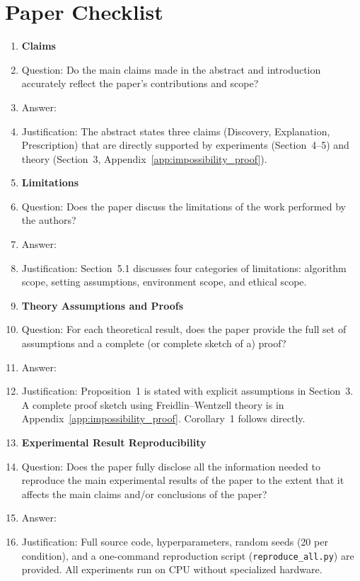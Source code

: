 
\section*{Paper Checklist}

\begin{enumerate}

\item {\bf Claims}
    \item[] Question: Do the main claims made in the abstract and introduction accurately reflect the paper's contributions and scope?
    \item[] Answer: \answerYes{}
    \item[] Justification: The abstract states three claims (Discovery, Explanation, Prescription) that are directly supported by experiments (Section~4--5) and theory (Section~3, Appendix~\ref{app:impossibility_proof}).

\item {\bf Limitations}
    \item[] Question: Does the paper discuss the limitations of the work performed by the authors?
    \item[] Answer: \answerYes{}
    \item[] Justification: Section~5.1 discusses four categories of limitations: algorithm scope, setting assumptions, environment scope, and ethical scope.

\item {\bf Theory Assumptions and Proofs}
    \item[] Question: For each theoretical result, does the paper provide the full set of assumptions and a complete (or complete sketch of a) proof?
    \item[] Answer: \answerYes{}
    \item[] Justification: Proposition~1 is stated with explicit assumptions in Section~3. A complete proof sketch using Freidlin--Wentzell theory is in Appendix~\ref{app:impossibility_proof}. Corollary~1 follows directly.

\item {\bf Experimental Result Reproducibility}
    \item[] Question: Does the paper fully disclose all the information needed to reproduce the main experimental results of the paper to the extent that it affects the main claims and/or conclusions of the paper?
    \item[] Answer: \answerYes{}
    \item[] Justification: Full source code, hyperparameters, random seeds (20 per condition), and a one-command reproduction script (\texttt{reproduce\_all.py}) are provided. All experiments run on CPU without specialized hardware.


\end{enumerate}
